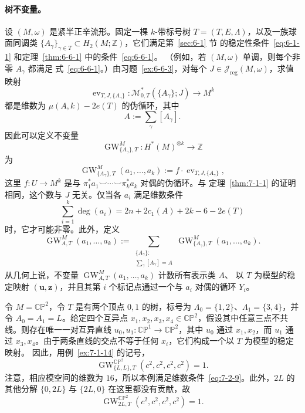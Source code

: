 \paragraph{树不变量。}
设 $(M,\omega)$ 是紧半正辛流形。固定一棵 $k$-带标号树
$T=(T,E,\Lambda)$，以及一族球面同调类
$\{A_\gamma\}_{\gamma\in T}\subset H_2(M;\mathbb Z)$，它们满足第~\ref{sec:6-1} 节
的稳定性条件~\eqref{eq:6-1-1} 和定理~\ref{thm:6-6-1} 中的条件~\eqref{eq:6-6-1}。
（例如，若 $(M,\omega)$ 单调，则每个非零 $A_\gamma$ 都满足
式~\eqref{eq:6-6-1}。）由习题~\ref{ex:6-6-3}，对每个
$J\in\mathcal J_{\mathrm{reg}}(M,\omega)$，求值映射
\[
  \operatorname{ev}_{T,J,\{A_\gamma\}}:
  \mathcal M^*_{0,T}(\{A_\gamma\};J)\longrightarrow M^k
\]
都是维数为 $\mu(A,k)-2e(T)$ 的伪循环，其中
\[
  A:=\sum_\gamma[A_\gamma].
\]
因此可以定义不变量
\[
  \operatorname{GW}^{M}_{\{A_\gamma\},T}:
  H^*(M)^{\otimes k}\longrightarrow\mathbb Z
\]
为
\[
  \operatorname{GW}^{M}_{\{A_\gamma\},T}(a_1,\ldots,a_k)
  :=f\cdot\operatorname{ev}_{T,J,\{A_\gamma\}},
\]
这里 $f:U\to M^k$ 是与
$\pi_1^*a_1\smile\cdots\smile\pi_k^*a_k$ 对偶的伪循环。与
定理~\ref{thm:7-1-1} 的证明相同，这个数与 $J$ 无关。仅当各 $a_i$ 满足维数条件
\begin{equation}\label{eq:7-2-9}
  \sum_{i=1}^{k}\deg(a_i)
  =2n+2c_1(A)+2k-6-2e(T)
\end{equation}
时，它才可能非零。此外，定义
\[
  \operatorname{GW}^{M}_{A,T}(a_1,\ldots,a_k)
  :=\sum_{\substack{\{A_\gamma\}:\\
                     \sum_\gamma[A_\gamma]=A}}
    \operatorname{GW}^{M}_{\{A_\gamma\},T}(a_1,\ldots,a_k).
\]
从几何上说，不变量 $\operatorname{GW}^{M}_{A,T}(a_1,\ldots,a_k)$ 计数所有表示类 $A$、
以 $T$ 为模型的稳定映射 $(\mathbf u,\mathbf z)$，并且其第 $i$ 个标记点通过一个与
$a_i$ 对偶的循环 $Y_i$。

\begin{example}\label{ex:7-2-7}
令 $M=\mathbb{CP}^2$，令 $T$ 是有两个顶点 $0,1$ 的树，标号为
$\Lambda_0=\{1,2\}$、$\Lambda_1=\{3,4\}$，并令 $A_0=A_1=L$。给定四个互异点
$x_1,x_2,x_3,x_4\in\mathbb{CP}^2$，假设其中任意三点不共线。则存在唯一一对互异直线
$u_0,u_1:\mathbb{CP}^1\to\mathbb{CP}^2$，其中 $u_0$ 通过 $x_1,x_2$，而 $u_1$ 通过
$x_3,x_4$。由于两条直线的交点不等于任何 $x_i$，它们构成一个以 $T$ 为模型的稳定映射。
因此，用例~\ref{ex:7-1-14} 的记号，
\[
  \operatorname{GW}^{\mathbb{CP}^2}_{\{L,L\},T}
  (c^2,c^2,c^2,c^2)=1.
\]
注意，相应模空间的维数为 $16$，所以本例满足维数条件~\eqref{eq:7-2-9}。此外，$2L$ 的
其他分解 $\{0,2L\}$ 与 $\{2L,0\}$ 在这里都没有贡献，故
\[
  \operatorname{GW}^{\mathbb{CP}^2}_{2L,T}(c^2,c^2,c^2,c^2)=1.
\]
\end{example}

